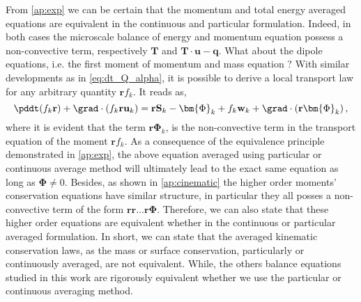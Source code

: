 From \ref{ap:exp} we can be certain that the momentum and total energy averaged equations are equivalent in the continuous and particular formulation.
Indeed, in both cases the microscale balance of energy and momentum equation possess a non-convective term, respectively $\textbf{T}$ and $\textbf{T}\cdot\textbf{u}-\textbf{q}$.
What about the dipole equations, i.e. the first moment of momentum and mass equation ?
With similar developments as in \ref{eq:dt_Q_alpha}, it is possible to derive a local transport law for any arbitrary quantity $\textbf{r}f_k$.
It reads as,
\begin{equation*}
    \pddt (f_k \textbf{r})
    + \grad \cdot \left(
        f_k \textbf{r} \textbf{u}_k
    \right)
    = \textbf{r} \textbf{S}_k 
    - \bm{\Phi}_k
    + f_k \textbf{w}_k
    + \grad \cdot \left(
        \textbf{r}\bm{\Phi}_k
    \right),
\end{equation*}
where it is evident that the term $\textbf{r} \bm{\Phi}_k$, is the non-convective term in the transport equation of the moment $\textbf{r}f_k$.
As a consequence of the equivalence principle demonstrated in \ref{ap:exp}, the above equation averaged using particular or continuous average method will ultimately lead to the exact same equation as long as $\bm{\Phi}\neq 0$. 
Besides, as shown in \ref{ap:cinematic} the higher order moments' conservation equations have similar structure, in particular they all posses a non-convective term of the form $\textbf{rr}\ldots\textbf{r}\mathbf{\Phi}$.
Therefore, we can also state that these higher order equations are equivalent whether in the continuous or particular averaged formulation.
In short, we can state that the averaged kinematic conservation laws, as the mass or surface conservation, particularly or continuously averaged, are not equivalent. 
While, the others balance equations studied in this work are rigorously equivalent whether we use the particular or continuous averaging method.   


